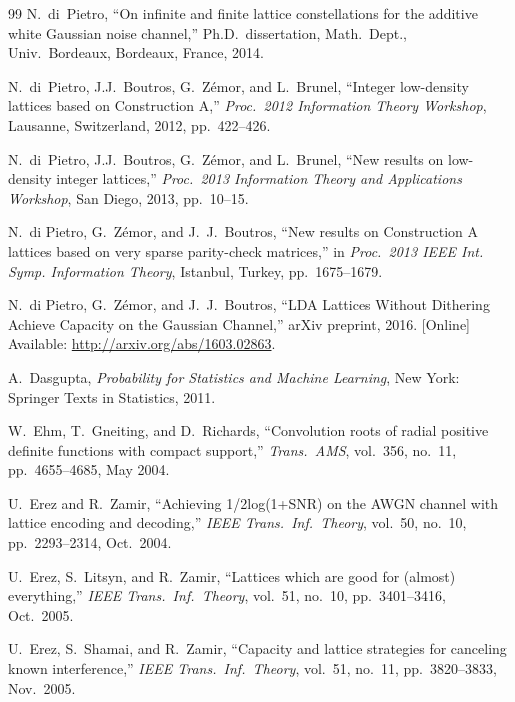 \documentclass[main.tex]{subfiles}
\begin{document}
\begin{thebibliography}{99}
 N.\ di~Pietro, ``On infinite and finite lattice constellations for the additive white Gaussian noise channel,'' Ph.D.\ dissertation, Math.\ Dept., Univ.\ Bordeaux, Bordeaux, France, 2014.
 
 N.\ di~Pietro,  J.J.\ Boutros, G.\ Z\'{e}mor, and L.\ Brunel,
 ``Integer low-density lattices based on Construction A,''
 \emph{Proc.\ 2012 Information Theory Workshop}, Lausanne, Switzerland, 2012, pp.\ 422--426.

 N.\ di~Pietro, J.J.\ Boutros, G.\ Z\'{e}mor, and L.\ Brunel, ``New results on low-density integer lattices,'' \emph{Proc.\ 2013 Information Theory and Applications Workshop}, San Diego, 2013, pp.\ 10--15. 
 
N.\ di Pietro, G.~Z\'{e}mor, and J.\ J.\ Boutros, 
``New results on Construction A lattices based on very sparse parity-check matrices,'' in \emph{Proc.\ 2013 IEEE Int. Symp. Information Theory}, Istanbul, Turkey, pp.\ 1675--1679.

N.\ di Pietro, G.\ Z\'{e}mor, and J.\ J.\ Boutros,
``LDA Lattices Without Dithering Achieve Capacity on the Gaussian Channel,'' arXiv preprint, 2016. [Online] Available: \url{http://arxiv.org/abs/1603.02863}.

A.\ Dasgupta, 
\emph{Probability for Statistics and Machine Learning}, New York: Springer Texts in Statistics, 2011.

 W.\ Ehm, T.\ Gneiting, and D.\ Richards, ``Convolution
   roots of radial positive definite functions with compact support,''
   \emph{Trans.\ AMS}, vol.\ 356, no.\ 11, pp.\ 4655--4685, May 2004.

 
U.~Erez and R.~Zamir, ``Achieving 1/2log(1+SNR) on the AWGN channel with lattice encoding and decoding,''
\emph{IEEE Trans.\ Inf.\ Theory}, vol.\ 50, no.\ 10, pp.\ 2293--2314, Oct.\ 2004.

U.~Erez, S.\ Litsyn, and R.\ Zamir, ``Lattices which are good for (almost) everything,'' 
\emph{IEEE Trans.\ Inf.\ Theory},  vol.\ 51, no.\ 10, pp.\ 3401--3416, Oct.\ 2005.

U.\ Erez, S.\ Shamai, and R.\ Zamir, ``Capacity and lattice strategies for canceling known interference,''
\emph{IEEE Trans.\ Inf.\ Theory},  vol.\ 51, no.\ 11, pp.\ 3820--3833, Nov.\ 2005.


\end{thebibliography}
\end{document}
